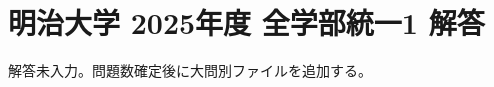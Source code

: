 \documentclass[../../uem_mei_a.tex]{subfiles}
\begin{document}
    \section{明治大学 2025年度 全学部統一1 解答}

    解答未入力。問題数確定後に大問別ファイルを追加する。
\end{document}
